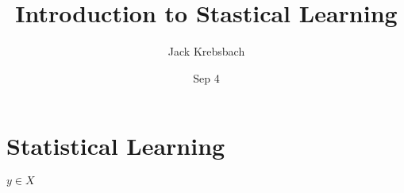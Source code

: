 \documentclass{article}
\title{Introduction to Stastical Learning}
\author{Jack Krebsbach }
\date{Sep 4}
\begin{document}
\maketitle


\section{Statistical Learning}


$y \in X$
\end{document}
